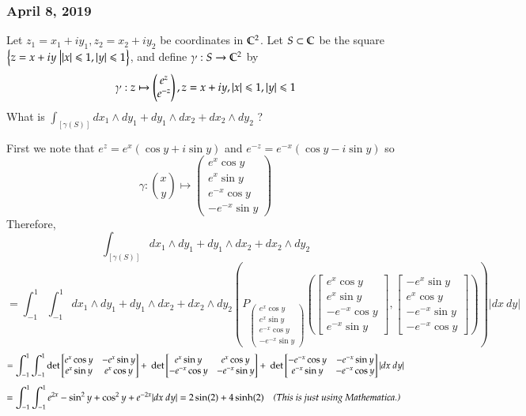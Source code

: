 \subsubsection*{April 8, 2019}

 Let $z_1=x_1+iy_1, z_2=x_2+iy_2$ be coordinates in $\mathbb{C}^2$. Let $S \subset \mathbb{C}$ be the square $\left\{ z=x+iy\ \big| |x|\leqslant 1, |y|\leqslant 1 \right\}$, and define $\gamma : S \to \mathbb{C}^2$ by
\[\gamma : z \mapsto \begin{pmatrix} e^z \\ e^{-z} \end{pmatrix}, z=x+iy, |x|\leqslant 1, |y| \leqslant 1 \]
What is $\displaystyle \int_{[\gamma(S)]} dx_1\land dy_1 + dy_1 \land dx_2 + dx_2 \land dy_2$ ?

First we note that $e^z = e^x(\cos y + i\sin y)$ and $e^{-z} = e^{-x}(\cos y - i\sin y)$ so 
\[\gamma : \binom{x}{y} \mapsto \begin{pmatrix} e^x \cos y \\ e^x \sin y \\ e^{-x} \cos y \\ - e^{-x} \sin y\end{pmatrix}\] 
Therefore,
$$\int_{[\gamma(S)]} dx_1 \wedge dy_1 + dy_1 \wedge dx_2 + dx_2 \wedge dy_2 $$
$$ = \int_{-1}^1\int_{-1}^1 dx_1 \wedge dy_1 + dy_1 \wedge dx_2 + dx_2 \wedge dy_2\left( P_{\begin{pmatrix} e^x \cos y \\ e^x \sin y \\ e^{-x} \cos y \\ - e^{-x} \sin y\end{pmatrix}} \left(\begin{bmatrix}e^x\cos y \\ e^x\sin y \\ -e^{-x}\cos y \\ e^{-x}\sin y\end{bmatrix}, \begin{bmatrix} -e^x\sin y \\ e^x\cos y \\ -e^{-x}\sin y \\ -e^{-x}\cos y\end{bmatrix}\right)\right) |dx\ dy|$$
$$ = \int_{-1}^1\int_{-1}^1 \mathrm{det} \begin{bmatrix}e^x\cos y & -e^x\sin y \\ e^x\sin y & e^x\cos y\end{bmatrix} +\ \mathrm{det} \begin{bmatrix}e^x\sin y & e^x\cos y \\ -e^{-x} \cos y & -e^{-x} \sin y\end{bmatrix} +\ \mathrm{det} \begin{bmatrix} -e^{-x} \cos y & -e^{-x} \sin y \\ e^{-x}\sin y & -e^{-x}\cos y\end{bmatrix} |dx\ dy|$$
$$ = \int_{-1}^1\int_{-1}^1 e^{2x} -\sin^2 y + \cos^2 y + e^{-2x} |dx\ dy|=2\sin(2) +4\sinh(2)\quad \text{\emph{(This is just using Mathematica.)} }$$

